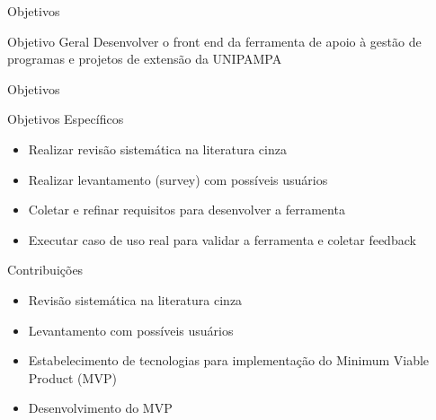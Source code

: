 \begin{frame}{{\sffamily Objetivos}}
\begin{block}{Objetivo Geral}
Desenvolver o front end da ferramenta de apoio à gestão de programas e projetos de extensão da UNIPAMPA
\end{block}
\end{frame}

\begin{frame}{{\sffamily Objetivos}}
\begin{block}{Objetivos Específicos}
\begin{itemize}%
		\item Realizar revisão sistemática na literatura cinza
		\item Realizar levantamento (survey) com possíveis usuários
		\item Coletar e refinar requisitos para desenvolver a ferramenta
		\item Executar caso de uso real para validar a ferramenta  e coletar feedback
    \end{itemize}
\end{block}
\end{frame}

\begin{frame}{{\sffamily Contribuições}}
\begin{block}{}
\begin{itemize}%
		\item Revisão sistemática na literatura cinza
		\item Levantamento com possíveis usuários
		\item Estabelecimento de tecnologias para implementação do Minimum Viable Product (MVP)
		\item Desenvolvimento do MVP
    \end{itemize}
\end{block}
\end{frame}
